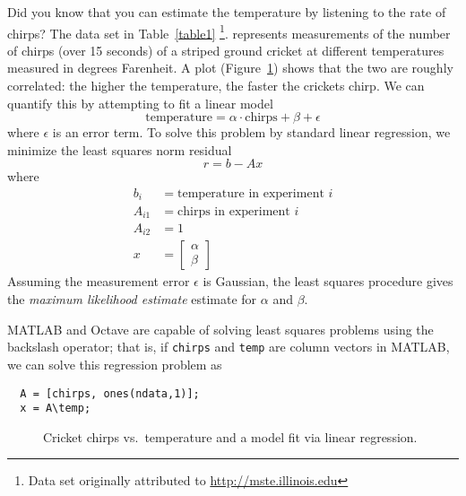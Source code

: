 \documentclass[12pt, leqno]{article} %
\begin{document}
Did you know that you can estimate the temperature by listening to the
rate of chirps?  The data set in Table~\ref{table1}%
\footnote{Data set originally attributed to
  \url{http://mste.illinois.edu}}.  represents measurements of the
number of chirps (over 15 seconds) of a striped ground cricket at
different temperatures measured in degrees Farenheit.  A plot
(Figure~\ref{fig2}) shows that the two are roughly correlated: the
higher the temperature, the faster the crickets chirp.  We can
quantify this by attempting to fit a linear model
\[
  \mbox{temperature} = \alpha \cdot \mbox{chirps} + \beta + \epsilon
\]
where $\epsilon$ is an error term.  To solve this problem by standard linear
regression, we minimize the least squares norm residual
\[
  r = b-Ax
\]
where
\begin{align*}
  b_{i} &= \mbox{temperature in experiment } i \\
  A_{i1} &= \mbox{chirps in experiment } i \\
  A_{i2} &= 1 \\
  x &= \begin{bmatrix} \alpha \\ \beta \end{bmatrix}
\end{align*}
Assuming the measurement error $\epsilon$ is Gaussian, the least
squares procedure gives the {\em maximum likelihood estimate}
estimate for $\alpha$ and $\beta$.

MATLAB and Octave are capable of solving least squares problems using
the backslash operator; that is, if {\tt chirps} and {\tt temp} are
column vectors in MATLAB, we can solve this regression problem as
\begin{lstlisting}
  A = [chirps, ones(ndata,1)];
  x = A\temp;
\end{lstlisting}

\begin{figure}
  \begin{center}
  \end{center}
  \caption{Cricket chirps vs.~temperature and a model fit via
    linear regression.}
  \label{fig2}
\end{figure}
\end{document}
